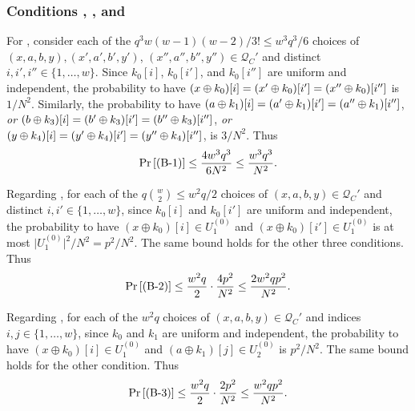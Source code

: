 %
%
%
\subsubsection{Conditions \bone, \btwo, and \bthree}

For \bone, consider each of the $q^3w(w-1)(w-2)/3!\leq w^3q^3/6$ choices of $(x,a,b,y),(x',a',b',y')$, $(x'',a'',b'',y'')\in \mathcal{Q}_{C}'$ and distinct $i, i', i'' \in \{1, \ldots, w\}$. Since $k_0[i]$, $k_0[i']$, and $k_0[i'']$ are uniform and independent, the probability to have $(x\oplus k_0)[i]=(x'\oplus k_0)[i']=(x''\oplus k_0)[i'']$ is $1/N^2$. Similarly, the probability to have $(a\oplus k_1)[i]=(a'\oplus k_1)[i']=(a''\oplus k_1)[i'']$, {\it or} $(b\oplus k_3)[i]=(b'\oplus k_3)[i']=(b''\oplus k_3)[i'']$, {\it or} $(y\oplus k_4)[i]=(y'\oplus k_4)[i']=(y''\oplus k_4)[i'']$, is $3/N^2$. Thus
%
$$
\operatorname{Pr}\left[\text{(B-1)}\right] \leq \frac{4w^3q^3}{6N^2}\leq \frac{w^3q^3}{N^2}.
$$
%


		

%

Regarding \btwo, for each of the $q{w\choose 2}\leq w^2q/2$ choices of $(x,a,b, y) \in \mathcal{Q}_{C}'$ and distinct $i, i' \in \{1, \ldots, w\}$, since $k_0[i]$ and $k_0[i']$ are uniform and independent, the probability to have $(x \oplus k_{0})[i]\in U_1^{(0)}$ and $(x \oplus k_0)[i']\in U_1^{(0)}$ is at most $\big|U_1^{(0)}\big|^2/N^2=p^2/N^2$. The same bound holds for the other three conditions. Thus
%
$$
\operatorname{Pr}\left[\text{(B-2)}\right] \leq \frac{w^{2} q}{2}\cdot\frac{4p^2}{N^2}\leq\frac{2w^{2} q p^2}{N^{2}}.
$$
%




%


Regarding \bthree, for each of the $w^2q$ choices of $(x,a,b,y)\in\mathcal{Q}_{C}'$ and indices $i, j \in \{1, \ldots, w\}$, since $k_{0}$ and $k_1$ are uniform and independent, the probability to have $\left(x \oplus k_{0}\right)[i]\in U_1^{(0)}$ and $\left(a\oplus k_{1}\right)[j]\in U_2^{(0)}$ is $p^2/N^2$. The same bound holds for the other condition. Thus
%
$$
\operatorname{Pr}\left[\text{(B-3)}\right] \leq \frac{w^{2} q}{2}\cdot\frac{2p^2}{N^2}\leq\frac{w^{2} q p^2}{N^{2}}.
$$
%




